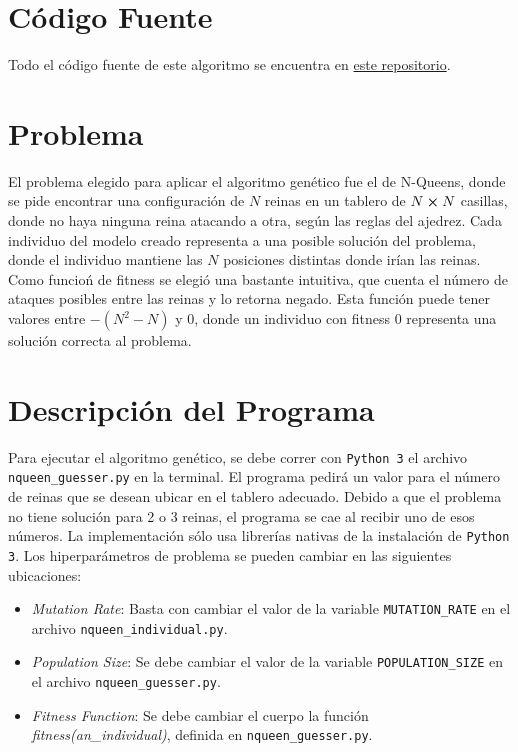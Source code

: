 \documentclass[letterpaper,11pt]{article} %
\begin{document}







\section*{Código Fuente}
  Todo el código fuente de este algoritmo se encuentra en \href{https://github.com/danno-s/genetic-algorithm}{este repositorio}.

\section*{Problema}
  El problema elegido para aplicar el algoritmo genético fue el de N-Queens, donde se pide encontrar una configuración de $N$ reinas en un tablero de $N\cross N$ casillas, donde no haya ninguna reina atacando a otra, según las reglas del ajedrez. Cada individuo del modelo creado representa a una posible solución del problema, donde el individuo mantiene las $N$ posiciones distintas donde irían las reinas. Como funcioń de fitness se elegió una bastante intuitiva, que cuenta el número de ataques posibles entre las reinas y lo retorna negado. Esta función puede tener valores entre $-(N^2 - N)$ y $0$, donde un individuo con fitness 0 representa una solución correcta al problema.

\section*{Descripción del Programa}
  Para ejecutar el algoritmo genético, se debe correr con \texttt{Python 3} el archivo \texttt{nqueen\_guesser.py} en la terminal. El programa pedirá un valor para el número de reinas que se desean ubicar en el tablero adecuado. Debido a que el problema no tiene solución para 2 o 3 reinas, el programa se cae al recibir uno de esos números. La implementación sólo usa librerías nativas de la instalación de \texttt{Python 3}. Los hiperparámetros de problema se pueden cambiar en las siguientes ubicaciones:
  
  \begin{itemize}
    \item \textit{Mutation Rate}: Basta con cambiar el valor de la variable \texttt{MUTATION\_RATE} en el archivo \texttt{nqueen\_individual.py}.
    \item \textit{Population Size}: Se debe cambiar el valor de la variable \texttt{POPULATION\_SIZE} en el archivo \texttt{nqueen\_guesser.py}.
    \item \textit{Fitness Function}: Se debe cambiar el cuerpo la función \textit{fitness(an\_individual)}, definida en \texttt{nqueen\_guesser.py}.
  \end{itemize}
\end{document}
